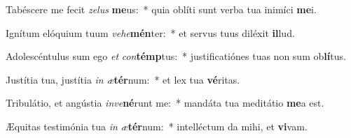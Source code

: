 \item Tabéscere me fecit \textit{ze}\textit{lus} \textbf{me}us:~* quia oblíti sunt verba tua inimíci \textbf{me}i.
\item Ignítum elóquium tuum \textit{ve}\textit{he}\textbf{mén}ter:~* et servus tuus diléxit \textbf{il}lud.
\item Adolescéntulus sum ego \textit{et} \textit{con}\textbf{témp}tus:~* justificatiónes tuas non sum ob\textbf{lí}tus.
\item Justítia tua, justítia \textit{in} \textit{æ}\textbf{tér}num:~* et lex tua \textbf{vé}ritas.
\item Tribulátio, et angústia \textit{in}\textit{ve}\textbf{né}runt me:~* mandáta tua meditátio \textbf{me}a est.
\item Æquitas testimónia tua \textit{in} \textit{æ}\textbf{tér}num:~* intelléctum da mihi, et \textbf{vi}vam.
